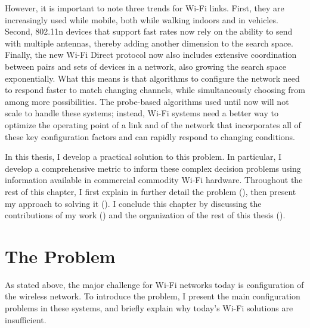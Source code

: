 However, it is important to note three trends for Wi-Fi links. First, they are increasingly used while mobile, both while walking indoors and in vehicles. Second, 802.11n devices that support fast rates now rely on the ability to send with multiple antennas, thereby adding another dimension to the search space. Finally, the new Wi-Fi Direct protocol now also includes extensive coordination between pairs and sets of devices in a network, also growing the search space exponentially. What this means is that algorithms to configure the network need to respond faster to match changing channels, while simultaneously choosing from among more possibilities. The probe-based algorithms used until now will not scale to handle these systems; instead, Wi-Fi systems need a better way to optimize the operating point of a link and of the network that incorporates all of these key configuration factors and can rapidly respond to changing conditions.


In this thesis, I develop a practical solution to this problem. In particular, I develop a comprehensive metric to inform these complex decision problems using information available in commercial commodity Wi-Fi hardware. Throughout the rest of this chapter, I first explain in further detail the problem (), then present my approach to solving it (). I conclude this chapter by discussing the contributions of my work () and the organization of the rest of this thesis ().

\section{The Problem}
\label{sec:intro_problem}
As stated above, the major challenge for Wi-Fi networks today is configuration of the wireless network. To introduce the problem, I present the main configuration problems in these systems, and briefly explain why today's Wi-Fi solutions are insufficient.

